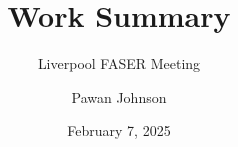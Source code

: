 \documentclass{beamer}
\title{Work Summary}
\subtitle{Liverpool FASER Meeting}
\date{February 7, 2025}
\author{Pawan Johnson}
\institute{University of Liverpool}
\begin{document}
\begingroup
{}
\begin{frame}
    \maketitle
\end{frame}
\endgroup






\appendix
\appendsubframes
\end{document}
